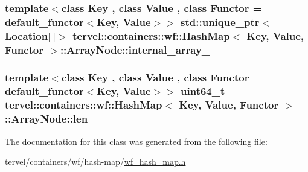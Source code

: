\subsubsection[{internal\+\_\+array\+\_\+}]{\setlength{\rightskip}{0pt plus 5cm}template$<$class Key , class Value , class Functor  = default\+\_\+functor$<$\+Key, Value$>$$>$ std\+::unique\+\_\+ptr$<${\bf Location}\mbox{[}$\,$\mbox{]}$>$ {\bf tervel\+::containers\+::wf\+::\+Hash\+Map}$<$ Key, {\bf Value}, Functor $>$\+::Array\+Node\+::internal\+\_\+array\+\_\+\hspace{0.3cm}{\ttfamily [private]}}\label{classtervel_1_1containers_1_1wf_1_1_hash_map_1_1_array_node_a38edcefe8d4958da95ab4a464d23ae33}
\hypertarget{classtervel_1_1containers_1_1wf_1_1_hash_map_1_1_array_node_a198987828d99d665861b727aa4a85b69}{}
\subsubsection[{len\+\_\+}]{\setlength{\rightskip}{0pt plus 5cm}template$<$class Key , class Value , class Functor  = default\+\_\+functor$<$\+Key, Value$>$$>$ uint64\+\_\+t {\bf tervel\+::containers\+::wf\+::\+Hash\+Map}$<$ Key, {\bf Value}, Functor $>$\+::Array\+Node\+::len\+\_\+\hspace{0.3cm}{\ttfamily [private]}}\label{classtervel_1_1containers_1_1wf_1_1_hash_map_1_1_array_node_a198987828d99d665861b727aa4a85b69}


The documentation for this class was generated from the following file\+:\begin{DoxyCompactItemize}
\item 
tervel/containers/wf/hash-\/map/\hyperlink{wf__hash__map_8h}{wf\+\_\+hash\+\_\+map.\+h}\end{DoxyCompactItemize}
